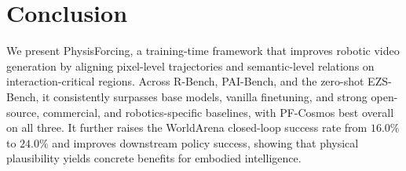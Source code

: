 \section{Conclusion}

We present PhysisForcing, a training-time framework that improves robotic video generation by
aligning pixel-level trajectories and semantic-level relations on interaction-critical regions.
Across R-Bench, PAI-Bench, and the zero-shot EZS-Bench, it consistently surpasses base models,
vanilla finetuning, and strong open-source, commercial, and robotics-specific baselines, with
PF-Cosmos best overall on all three. It further raises the WorldArena closed-loop success rate
from $16.0\%$ to $24.0\%$ and improves downstream policy success, showing that physical
plausibility yields concrete benefits for embodied intelligence.
